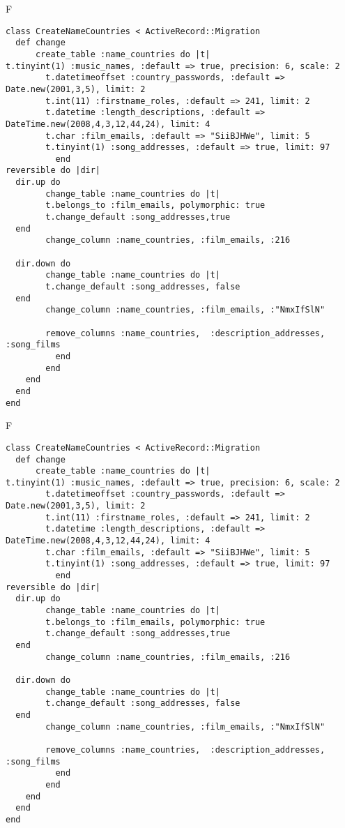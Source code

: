 F
\begin{verbatim}
class CreateNameCountries < ActiveRecord::Migration
  def change
	  create_table :name_countries do |t|
t.tinyint(1) :music_names, :default => true, precision: 6, scale: 2
		t.datetimeoffset :country_passwords, :default => Date.new(2001,3,5), limit: 2
		t.int(11) :firstname_roles, :default => 241, limit: 2
		t.datetime :length_descriptions, :default => DateTime.new(2008,4,3,12,44,24), limit: 4
		t.char :film_emails, :default => "SiiBJHWe", limit: 5
		t.tinyint(1) :song_addresses, :default => true, limit: 97
		  end
reversible do |dir|
  dir.up do
		change_table :name_countries do |t|
		t.belongs_to :film_emails, polymorphic: true
 		t.change_default :song_addresses,true
  end
 		change_column :name_countries, :film_emails, :216
   
  dir.down do
		change_table :name_countries do |t|
		t.change_default :song_addresses, false
  end
 		change_column :name_countries, :film_emails, :"NmxIfSlN"
   
		remove_columns :name_countries,  :description_addresses, :song_films 
	      end
	    end
    end 
  end
end

\end{verbatim}

F
\begin{verbatim}
class CreateNameCountries < ActiveRecord::Migration
  def change
	  create_table :name_countries do |t|
t.tinyint(1) :music_names, :default => true, precision: 6, scale: 2
		t.datetimeoffset :country_passwords, :default => Date.new(2001,3,5), limit: 2
		t.int(11) :firstname_roles, :default => 241, limit: 2
		t.datetime :length_descriptions, :default => DateTime.new(2008,4,3,12,44,24), limit: 4
		t.char :film_emails, :default => "SiiBJHWe", limit: 5
		t.tinyint(1) :song_addresses, :default => true, limit: 97
		  end
reversible do |dir|
  dir.up do
		change_table :name_countries do |t|
		t.belongs_to :film_emails, polymorphic: true
 		t.change_default :song_addresses,true
  end
 		change_column :name_countries, :film_emails, :216
   
  dir.down do
		change_table :name_countries do |t|
		t.change_default :song_addresses, false
  end
 		change_column :name_countries, :film_emails, :"NmxIfSlN"
   
		remove_columns :name_countries,  :description_addresses, :song_films 
	      end
	    end
    end 
  end
end

\end{verbatim}

